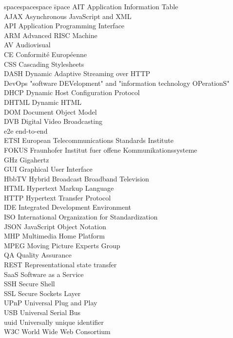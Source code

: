 
\begin{tabbing}
spacespacespace \= space \kill
AIT \> Application Information Table\\
AJAX \> Asynchronous JavaScript and XML\\
API \> Application Programming Interface\\
ARM \> Advanced RISC Machine\\
AV \> Audiovisual\\
CE \> Conformité Européenne\\
CSS \> Cascading Stylesheets\\
DASH \> Dynamic Adaptive Streaming over HTTP\\
DevOps \> "software DEVelopment" and "information technology OPerationS"\\
DHCP \> Dynamic Host Configuration Protocol\\
DHTML \> Dynamic HTML\\
DOM \> Document Object Model\\
DVB \> Digital Video Broadcasting\\
e2e \> end-to-end\\
ETSI \> European Telecommunications Standards Institute\\
FOKUS \> Fraunhofer Institut fuer offene Kommunikationssysteme\\
GHz \> Gigahertz\\
GUI \> Graphical User Interface\\
HbbTV \> Hybrid Broadcast Broadband Television\\
HTML \> Hypertext Markup Language\\
HTTP \> Hypertext Transfer Protocol\\
IDE \> Integrated Development Environment\\
ISO \> International Organization for Standardization\\
JSON \> JavaScript Object Notation\\
MHP \> Multimedia Home Platform\\
MPEG \> Moving Picture Experts Group\\
QA \> Quality Assurance\\
REST \> Representational state transfer\\
SaaS \> Software as a Service\\
SSH \> Secure Shell\\
SSL \> Secure Sockets Layer\\
UPnP \> Universal Plug and Play\\
USB \> Universal Serial Bus\\
uuid \> Universally unique identifier\\
W3C \> World Wide Web Consortium\\
\end{tabbing}
\endinput
